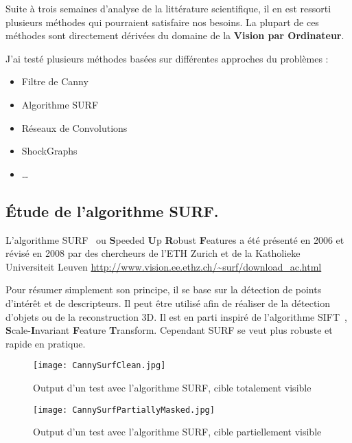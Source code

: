 Suite à trois semaines d'analyse de la littérature scientifique, il en est ressorti plusieurs méthodes qui pourraient satisfaire nos besoins. La plupart de ces méthodes sont directement dérivées du domaine de la \textbf{Vision par Ordinateur}.

J'ai testé plusieurs méthodes basées sur différentes approches du problèmes :
\begin{itemize}
	\item Filtre de Canny
	\item Algorithme SURF
	\item Réseaux de Convolutions
	\item ShockGraphs
	\item \ldots
\end{itemize}
\vspace{3mm}

\subsection{Étude de l'algorithme SURF.}

L'algorithme SURF~\cite{SURF} ou \textbf{S}peeded \textbf{U}p \textbf{R}obust \textbf{F}eatures a été présenté en 2006 et révisé en 2008 par des chercheurs de l'ETH Zurich et de la Katholieke Universiteit Leuven \url{http://www.vision.ee.ethz.ch/~surf/download_ac.html}

Pour résumer simplement son principe, il se base sur la détection de points d'intérêt et de descripteurs. Il peut être utilisé afin de réaliser de la détection d'objets ou de la reconstruction 3D. Il est en parti inspiré de l'algorithme SIFT~\cite{Lowe1999}, \textbf{S}cale-\textbf{I}nvariant \textbf{F}eature \textbf{T}ransform. Cependant SURF se veut plus robuste et rapide en pratique.

\begin{figure}[H]
    \centering
    \texttt{[image: CannySurfClean.jpg]}
	\caption{Output d'un test avec l'algorithme SURF, cible totalement visible} 
\end{figure}
\vspace{-6mm}

\begin{figure}[H]
    \centering
    \texttt{[image: CannySurfPartiallyMasked.jpg]}
	\caption{Output d'un test avec l'algorithme SURF, cible partiellement visible}\label{image.CannySurfPartiallyMasked} 
\end{figure}
\vspace{-6mm}

